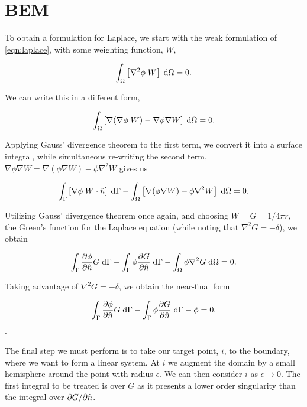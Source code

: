 \section{BEM}\label{sec:bem_derivation}

To obtain a {\bem} formulation for Laplace, we start with the weak formulation of \ref{eqn:laplace}, with some weighting function, $W$,

\begin{equation}
	\int_{\Omega} \left [\nabla^{2}\phi\;W\right]\;\text{d}\Omega = 0.
\end{equation}

We can write this in a different form,

\begin{equation}\label{eqn:laplace_weak_form}
	\int_{\Omega} \left [ \nabla(\nabla\phi\;W) - \nabla\phi\nabla W\right ] \;\di{\Omega} = 0.
\end{equation}

Applying Gauss' divergence theorem to the first term, we convert it into a surface integral, while simultaneous re-writing the second term, $\nabla\phi\nabla W = \nabla(\phi\nabla W) - \phi\nabla^{2}W$ gives us

\begin{equation}\label{eqn:laplace_bem_1}
	\int_{\Gamma}\left [ \nabla\phi\;W\cdot\nhat\right ]\;\di{\Gamma} - \int_{\Omega} \left [\nabla(\phi\nabla W) - \phi\nabla^{2}W\right ]\;\di{\Omega} = 0.
\end{equation}

Utilizing Gauss' divergence theorem once again, and choosing $W = G = 1/4\pi r$, the Green's function for the Laplace equation (while noting that $\nabla^{2}G = -\delta$), we obtain

\begin{equation}\label{eqn:laplace_bem_2}
	\int_{\Gamma}\partiald{\phi}{\nhat}G\;\di{\Gamma} - \int_{\Gamma} \phi\partiald{G}{\nhat}\;\di{\Gamma} - \int_{\Omega} \phi\nabla^{2}G\;\di{\Omega} = 0.
\end{equation}

Taking advantage of $\nabla^{2}G = -\delta$, we obtain the near-final form

\begin{equation}\label{eqn:laplace_bem_3}
	\int_{\Gamma}\partiald{\phi}{\nhat}G\;\di{\Gamma} - \int_{\Gamma} \phi\partiald{G}{\nhat}\;\di{\Gamma} - \phi = 0.
\end{equation}.

The final step we must perform is to take our target point, $i$, to the boundary, where we want to form a linear system. At $i$ we augment the domain by a small hemisphere around the point with radius $\epsilon$. We can then consider $i$ as $\epsilon \to 0$. The first integral to be treated is over $G$ as it presents a lower order singularity than the integral over $\partial G / \partial \hat{n}$.

